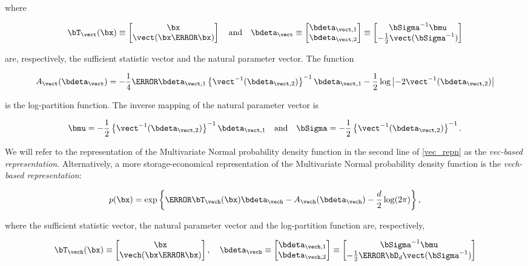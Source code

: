 \documentclass[12pt]{article}
\theoremstyle{plain}
\theoremstyle{definition}
\theoremstyle{remark}
\begin{document}
\noindent where

\[
	\bT_{\vect} (\bx) \equiv \begin{bmatrix}
		\bx \\
		\vect (\bx \T{\bx})
	\end{bmatrix} \quad
	\text{and} \quad
	\bdeta_{\vect} \equiv \begin{bmatrix}
		\bdeta_{\vect, 1} \\
		\bdeta_{\vect, 2}
	\end{bmatrix} \equiv \begin{bmatrix}
		\bSigma^{-1} \bmu \\
		-\frac12 \vect (\bSigma^{-1})
	\end{bmatrix}
\]

\noindent are, respectively, the sufficient statistic vector and the natural parameter vector. The function

\[
	A_{\vect} (\bdeta_{\vect}) =
		-\frac14 \T{\bdeta}_{\vect, 1} \left\{ \vect^{-1} (\bdeta_{\vect, 2}) \right\}^{-1} \bdeta_{\vect, 1}
		- \frac12 \log \left| -2 \vect^{-1} (\bdeta_{\vect, 2}) \right|
\]

\noindent is the log-partition function. The inverse mapping of the natural parameter vector is
\cite[equation~S.4]{wand17}

\begin{equation}
	\bmu = -\frac12 \left\{ \vect^{-1} (\bdeta_{\vect, 2}) \right\}^{-1} \bdeta_{\vect, 1} \quad
	\text{and} \quad
	\bSigma = -\frac12 \left\{ \vect^{-1} (\bdeta_{\vect, 2}) \right\}^{-1}.
\label{gauss_vec_comm_params}
\end{equation}

\noindent We will refer to the representation of the Multivariate Normal probability density function in the second
line of \eqref{vec_repn} as the \emph{vec-based representation}. Alternatively, a more storage-economical
representation of the Multivariate Normal probability density function is the \emph{vech-based representation}:

\[
	p (\bx) = \exp \left\{ \T{\bT_{\vech} (\bx)} \bdeta_{\vech} - A_{\vech} (\bdeta_{\vech}) - \frac{d}{2} \log (2 \pi) \right\},
\]

\noindent where the sufficient statistic vector, the natural parameter vector and the log-partition function are,
respectively,

\[
	\bT_{\vech} (\bx) \equiv \begin{bmatrix}
		\bx \\
		\vech (\bx \T{\bx})
	\end{bmatrix}, \quad
	\bdeta_{\vech} \equiv \begin{bmatrix}
		\bdeta_{\vech, 1} \\
		\bdeta_{\vech, 2}
	\end{bmatrix} \equiv \begin{bmatrix}
		\bSigma^{-1} \bmu \\
		-\frac12 \T{\bD_d} \vect(\bSigma^{-1})
	\end{bmatrix}
\]
\end{document}
